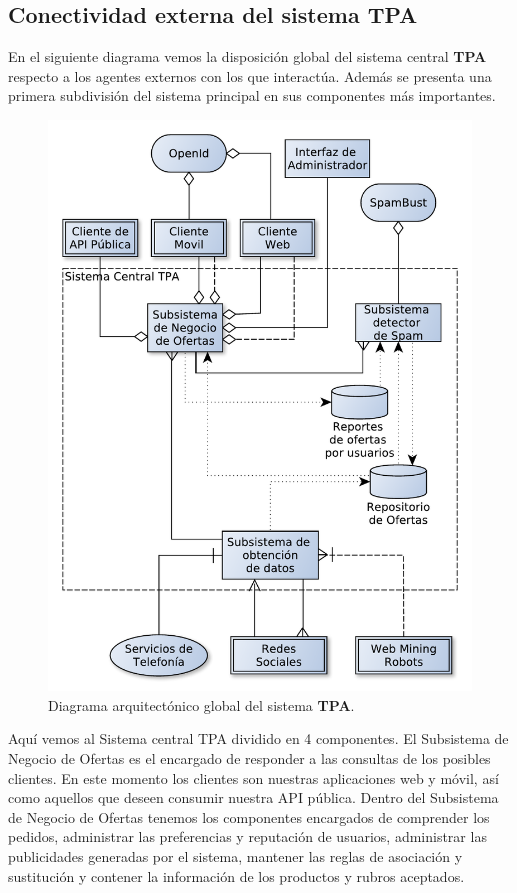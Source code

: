 \subsection{Conectividad externa del sistema \textbf{TPA}}

En el siguiente diagrama vemos la disposición global del sistema central \textbf{TPA} respecto a los agentes externos con los que interactúa. Además se presenta una primera subdivisión del sistema principal en sus componentes más importantes.

\begin{figure}[h]
	\centering
	\includegraphics[width=\textwidth]{graficos/arch/global_overview.pdf}
	\caption{Diagrama arquitectónico global del sistema \textbf{TPA}.}
\end{figure}

Aquí vemos al \textsf{Sistema central TPA} dividido en 4 componentes. El \textsf{Subsistema de Negocio de Ofertas} es el encargado de responder a las consultas de los posibles clientes. En este momento los clientes son nuestras aplicaciones web y móvil, así como aquellos que deseen consumir nuestra API pública. Dentro del \textsf{Subsistema de Negocio de Ofertas} tenemos los componentes encargados de comprender los pedidos, administrar las preferencias y reputación de usuarios, administrar las publicidades generadas por el sistema, mantener las reglas de asociación y sustitución y contener la información de los productos y rubros aceptados.

